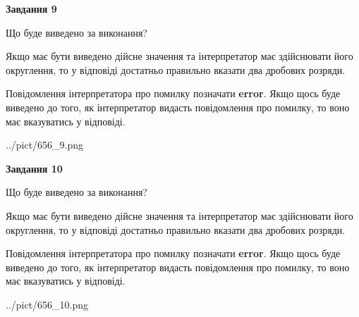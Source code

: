 \documentclass[12pt, ukrainian]{article}
\begin{document}
{\begin {Large}
{\begin {center}\textbf{Завдання 9}\end {center}}\par
Що буде виведено за виконання? \par

Якщо має бути виведено дійсне значення та інтерпретатор має здійснювати його округлення, 
то у відповіді достатньо правильно вказати два дробових розряди.

Повідомлення інтерпретатора про помилку позначати \textbf{error}.
Якщо щось буде виведено до того, як інтерпретатор видасть повідомлення про помилку, 
то воно має вказуватись у відповіді. \par

\begin{center}
	{../pict/656_9.png}
\end{center}
\newpage

{\begin {center}\textbf{Завдання 10}\end {center}}\par
Що буде виведено за виконання? \par

Якщо має бути виведено дійсне значення та інтерпретатор має здійснювати його округлення, 
то у відповіді достатньо правильно вказати два дробових розряди.

Повідомлення інтерпретатора про помилку позначати \textbf{error}.
Якщо щось буде виведено до того, як інтерпретатор видасть повідомлення про помилку, 
то воно має вказуватись у відповіді. \par

\begin{center}
	{../pict/656_10.png}
\end{center}
\newpage

\end {Large}}
\end{document}
